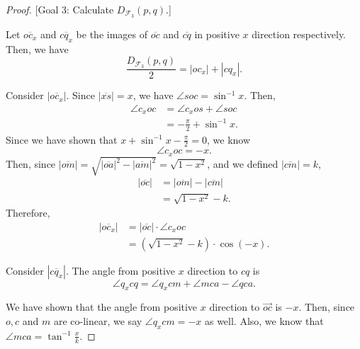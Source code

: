 \begin{proof}
\vspace{1cm}
[Goal 3: Calculate $D_{\mathcal{F}_3}(p, q)$.]

Let $\overline{oc_x}$ and $\overline{cq_x}$ be the images of $\overline{oc}$ and $\overline{cq}$ in positive $x$ direction respectively. Then, we have
\[\frac{D_{\mathcal{F}_3}(p, q)}{2} = |oc_x|+|cq_x|.\]

Consider $|\overline{oc_x}|$. Since $|\overline{xs}| = x$, we have $\angle soc = \sin^{-1}{x}$. Then,
\begin{align*}
    \angle c_xoc &=\angle c_xos + \angle soc\\
    &=-\frac{\pi}{2}+\sin^{-1}x.
\end{align*}
Since we have shown that $x+\sin^{-1}x-\frac{\pi}{2} = 0$, we know
\[\angle c_xoc = -x.\]
Then, since $|\overline{om}| = \sqrt{|\overline{oa}|^2-|\overline{am}|^2} = \sqrt{1-x^2}$, and we defined $|\overline{cm}| = k$, 
\begin{align*}
    |\overline{oc}| &= |\overline{om}|-|\overline{cm}|\\
    &= \sqrt{1-x^2} - k.
\end{align*}
Therefore, 
\begin{align*}
    |\overline{oc_x}| &= |\overline{oc}|\cdot\angle c_xoc\\
    &= (\sqrt{1-x^2} - k)\cdot \cos{(-x)}.
\end{align*}

Consider $|\overline{
cq_x}|$. The angle from positive $x$ direction to $cq$ is
\[\angle q_xcq = \angle q_xcm+\angle mca - \angle qca.\]




We  have shown  that the angle from positive $x$ direction to $\overrightarrow{oc}$ is $-x$. Then, since $o, c$ and $m$ are co-linear, we say $\angle q_xcm = -x$ as well. Also, we know that $\angle mca = \tan^{-1}\frac{x}{k}$. 


\end{proof}
